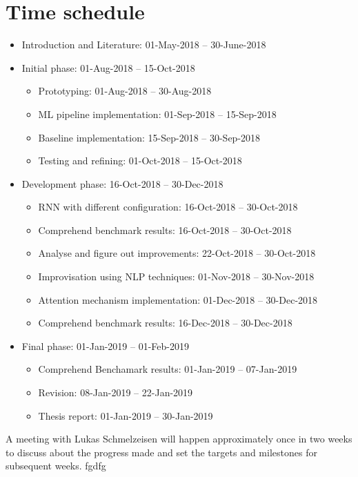 \documentclass[a4paper, 11pt]{article}
\begin{document}

\section{Time schedule}

\begin{itemize}
	\item Introduction and Literature: 01-May-2018 – 30-June-2018
	\item Initial phase: 01-Aug-2018 – 15-Oct-2018
	\begin{itemize}
		\item Prototyping: 01-Aug-2018 – 30-Aug-2018
		\item ML pipeline implementation: 01-Sep-2018 – 15-Sep-2018
        \item Baseline implementation: 15-Sep-2018 – 30-Sep-2018
        \item Testing and refining: 01-Oct-2018 – 15-Oct-2018
	\end{itemize}
	\item Development phase: 16-Oct-2018 – 30-Dec-2018
	\begin{itemize}
		\item RNN with different configuration: 16-Oct-2018 – 30-Oct-2018
		\item Comprehend benchmark results: 16-Oct-2018 – 30-Oct-2018
		\item Analyse and figure out improvements: 22-Oct-2018 – 30-Oct-2018
        \item Improvisation using NLP techniques: 01-Nov-2018 – 30-Nov-2018
        \item Attention mechanism implementation: 01-Dec-2018 – 30-Dec-2018
        \item Comprehend benchmark results: 16-Dec-2018 – 30-Dec-2018
	\end{itemize}
	\item Final phase: 01-Jan-2019 – 01-Feb-2019
	\begin{itemize}
	 	\item Comprehend Benchamark results: 01-Jan-2019 – 07-Jan-2019
		\item Revision: 08-Jan-2019 – 22-Jan-2019
		\item Thesis report: 01-Jan-2019 – 30-Jan-2019
	\end{itemize}
\end{itemize}

A meeting with Lukas Schmelzeisen will happen approximately once in two weeks to discuss about the progress made and set the targets and milestones for subsequent weeks. fgdfg
\end{document}
